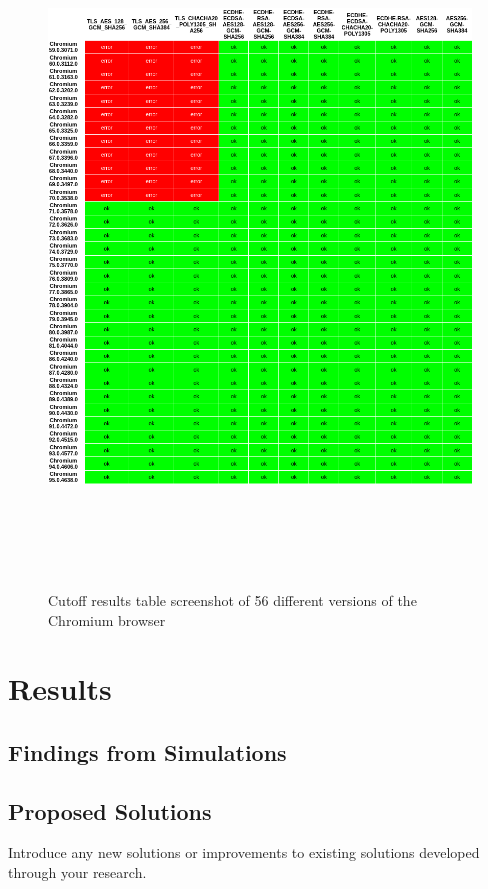 \documentclass[12pt]{scrbook}
\begin{document}
\begin{figure}[!h]
  \centering
  \includegraphics[height=18cm]{./images/cipher_checker_table.png}
  \caption{Cutoff results table screenshot of 56 different versions of the Chromium browser}
\end{figure}

\newpage

\chapter{Results} 
\section{Findings from Simulations} 

\section{Proposed Solutions} Introduce any new solutions or improvements to
existing solutions developed through your research.
\end{document}
